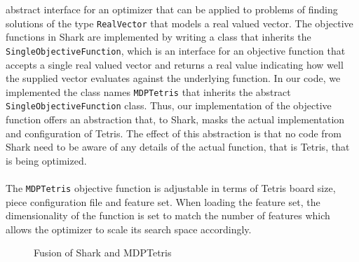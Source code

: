 abstract interface for an optimizer that can be applied to problems of finding 
solutions of the type \lstinline$RealVector$ that models a real valued vector.
The objective functions in Shark are implemented by writing a class that inherits 
the \lstinline$SingleObjectiveFunction$, which is an interface for an objective function 
that accepts a single real valued vector and returns a real value indicating how well the supplied
vector evaluates against the underlying function. In our code, we implemented the class names 
\lstinline$MDPTetris$ that inherits the abstract \lstinline$SingleObjectiveFunction$ class.
Thus, our implementation of the objective function offers an abstraction that, to Shark, masks
the actual implementation and configuration of Tetris. The effect of this abstraction is that 
no code from Shark need to be aware of any details of the actual function, that is Tetris, 
that is being optimized.\\
\\
The \lstinline$MDPTetris$ objective function is adjustable in terms of Tetris board size, piece 
configuration file and feature set. When loading the feature set, the dimensionality of 
the function is set to match the number of features which allows the optimizer to 
scale its search space accordingly.
\begin{figure}[h!]
\begin{center}
\end{center}
\caption{Fusion of Shark and MDPTetris}
\end{figure}


